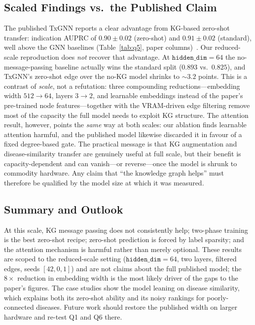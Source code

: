 \documentclass[conference]{IEEEtran}
\begin{document}
\subsection{Scaled Findings vs.\ the Published Claim}
The published TxGNN reports a clear advantage from KG-based zero-shot transfer:
indication AUPRC of $0.90\pm0.02$ (zero-shot) and $0.91\pm0.02$ (standard), well
above the GNN baselines (Table~\ref{tab:q5}, paper columns)~\cite{huang2024}. Our
reduced-scale reproduction does \emph{not} recover that advantage. At
$\texttt{hidden\_dim}=64$ the no-message-passing baseline actually wins the
standard split ($0.893$ vs.\ $0.825$), and TxGNN's zero-shot edge over the no-KG
model shrinks to ${\sim}3.2$ points. This is a contrast of \emph{scale}, not a
refutation: three compounding reductions---embedding width $512\!\to\!64$, layers
$3\!\to\!2$, and learnable embeddings instead of the paper's pre-trained node
features---together with the VRAM-driven edge filtering remove most of the
capacity the full model needs to exploit KG structure. The attention result,
however, points the \emph{same} way at both scales: our ablation finds learnable
attention harmful, and the published model likewise discarded it in favour of a
fixed degree-based gate. The practical message is that KG augmentation and
disease-similarity transfer are genuinely useful at full scale, but their benefit
is capacity-dependent and can vanish---or reverse---once the model is shrunk to
commodity hardware. Any claim that ``the knowledge graph helps'' must therefore
be qualified by the model size at which it was measured.

\subsection{Summary and Outlook}
At this scale, KG message passing does not consistently help; two-phase training
is the best zero-shot recipe; zero-shot prediction is forced by label sparsity;
and the attention mechanism is harmful rather than merely optional. These results
are scoped to the reduced-scale setting ($\texttt{hidden\_dim}=64$, two layers,
filtered edges, seeds $[42,0,1]$) and are not claims about the full published
model; the $8\times$ reduction in embedding width is the most likely driver of
the gaps to the paper's figures. The case studies show the model leaning on
disease similarity, which explains both its zero-shot ability and its noisy
rankings for poorly-connected diseases. Future work should restore the published
width on larger hardware and re-test Q1 and Q6 there.
\end{document}
